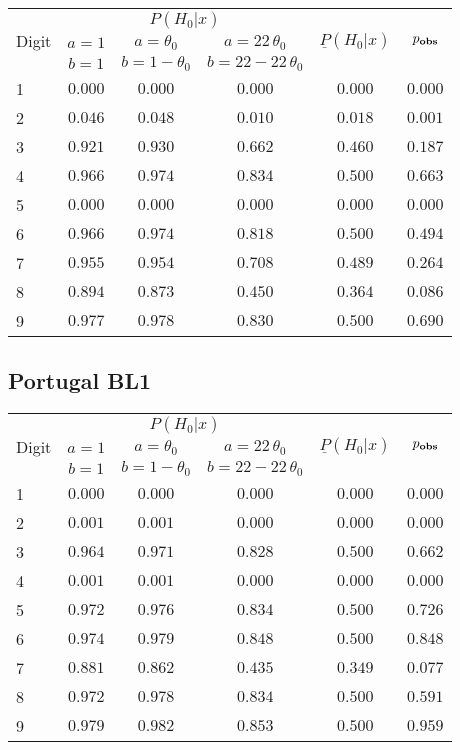 \documentclass[12pt,a4paper,draft]{article}
\begin{document}
\begin{table}[H] 
\begin{center}
\begin{tabular}{|l|c|c|c|c|c|}

\hline
\multicolumn{1}{|c|}{\multirow{3}{*}{Digit}} & \multicolumn{3}{c|}{$P{(H_0|{x})}$} &  \multicolumn{1}{c|}{\multirow{3}{*}{${\underline{P}}{(H_0|{x})}$}} & \multicolumn{1}{c|}{\multirow{3}{*}{${p_{\text{\textbf{obs}}}}$}} \tabularnewline
\cline{2-4}
&\multicolumn{1}{c|}{$a=1$}&\multicolumn{1}{c|}{$a = \theta_0$}&\multicolumn{1}{c|}{$a = 22 \, \theta_0$}& & \\
&\multicolumn{1}{c|}{$b=1$}&\multicolumn{1}{c|}{$b = 1-\theta_0$}&\multicolumn{1}{c|}{$b = 22-22 \, \theta_0$}& &\\
\hline

1&$0.000$&$0.000$&$0.000$&$0.000$&$0.000$\tabularnewline
2&$0.046$&$0.048$&$0.010$&$0.018$&$0.001$\tabularnewline
3&$0.921$&$0.930$&$0.662$&$0.460$&$0.187$\tabularnewline
4&$0.966$&$0.974$&$0.834$&$0.500$&$0.663$\tabularnewline
5&$0.000$&$0.000$&$0.000$&$0.000$&$0.000$\tabularnewline
6&$0.966$&$0.974$&$0.818$&$0.500$&$0.494$\tabularnewline
7&$0.955$&$0.954$&$0.708$&$0.489$&$0.264$\tabularnewline
8&$0.894$&$0.873$&$0.450$&$0.364$&$0.086$\tabularnewline
9&$0.977$&$0.978$&$0.830$&$0.500$&$0.690$\tabularnewline
\hline
\end{tabular}\end{center}
\end{table}

\subsection{Portugal BL1}

\begin{table}[H] 
\begin{center}
\begin{tabular}{|l|c|c|c|c|c|}

\hline
\multicolumn{1}{|c|}{\multirow{3}{*}{Digit}} & \multicolumn{3}{c|}{$P{(H_0|{x})}$} &  \multicolumn{1}{c|}{\multirow{3}{*}{${\underline{P}}{(H_0|{x})}$}} & \multicolumn{1}{c|}{\multirow{3}{*}{${p_{\text{\textbf{obs}}}}$}} \tabularnewline
\cline{2-4}
&\multicolumn{1}{c|}{$a=1$}&\multicolumn{1}{c|}{$a = \theta_0$}&\multicolumn{1}{c|}{$a = 22 \, \theta_0$}& & \\
&\multicolumn{1}{c|}{$b=1$}&\multicolumn{1}{c|}{$b = 1-\theta_0$}&\multicolumn{1}{c|}{$b = 22-22 \, \theta_0$}& &\\
\hline

1&$0.000$&$0.000$&$0.000$&$0.000$&$0.000$\tabularnewline
2&$0.001$&$0.001$&$0.000$&$0.000$&$0.000$\tabularnewline
3&$0.964$&$0.971$&$0.828$&$0.500$&$0.662$\tabularnewline
4&$0.001$&$0.001$&$0.000$&$0.000$&$0.000$\tabularnewline
5&$0.972$&$0.976$&$0.834$&$0.500$&$0.726$\tabularnewline
6&$0.974$&$0.979$&$0.848$&$0.500$&$0.848$\tabularnewline
7&$0.881$&$0.862$&$0.435$&$0.349$&$0.077$\tabularnewline
8&$0.972$&$0.978$&$0.834$&$0.500$&$0.591$\tabularnewline
9&$0.979$&$0.982$&$0.853$&$0.500$&$0.959$\tabularnewline
\hline
\end{tabular}\end{center}
\end{table}
\end{document}
